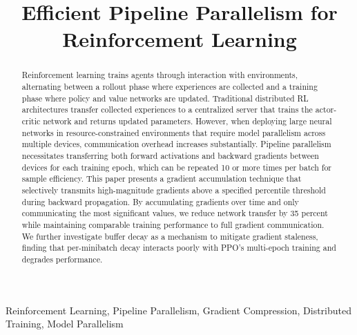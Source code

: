 \documentclass[conference]{IEEEtran}
\begin{document}
\title{Efficient Pipeline Parallelism for Reinforcement Learning\\
}

\author{
\and
{}
}

\maketitle

\begin{abstract}
Reinforcement learning trains agents through interaction with environments, alternating between a rollout phase where experiences are collected and a training phase where policy and value networks are updated. Traditional distributed RL architectures transfer collected experiences to a centralized server that trains the actor-critic network and returns updated parameters. However, when deploying large neural networks in resource-constrained environments that require model parallelism across multiple devices, communication overhead increases substantially. Pipeline parallelism necessitates transferring both forward activations and backward gradients between devices for each training epoch, which can be repeated 10 or more times per batch for sample efficiency. This paper presents a gradient accumulation technique that selectively transmits high-magnitude gradients above a specified percentile threshold during backward propagation. By accumulating gradients over time and only communicating the most significant values, we reduce network transfer by 35 percent while maintaining comparable training performance to full gradient communication. We further investigate buffer decay as a mechanism to mitigate gradient staleness, finding that per-minibatch decay interacts poorly with PPO's multi-epoch training and degrades performance.
\end{abstract}

\begin{IEEEkeywords}
Reinforcement Learning, Pipeline Parallelism, Gradient Compression, Distributed Training, Model Parallelism
\end{IEEEkeywords}
\end{document}
